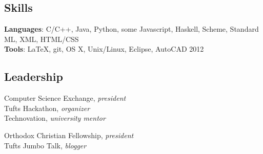 \documentclass{article}
\newcommand{\skill}[2]{
  \textbf{#1}: #2
  \smallskip
}
\newcommand{\skillNS}[2]{
  \textbf{#1}: #2
}
\begin{document}
\begin{comment}
\subsection*{Projects}
  \skill{Type Inference}
        {Implemented Hindley-Milner type inference for a teaching language in
        ML. Wrote a constraint solver to assign types to correct terms and
        reject ill-typed terms.} \\
  \skill{TapItOut}
        {Developed the front end of a native Android app that allows
        peer-to-peer money transfer using NFC technology. Built at the 2013
        University Hacker Olympics in San Francisco.} \\
  \skill{Virtual Machine}
        {Designed and wrote a 32-bit virtual machine in C. Implemented a set of
        basic operations and a macro assembler to create executable binary
        files. Wrote a calculator program in assembly.}
\end{comment}

\subsection*{Skills}
  \skillNS{Languages} {C/C++, Java, Python, some Javascript,
                      Haskell, Scheme, Standard ML, XML, HTML/CSS}\\
  \skillNS{Tools}     {LaTeX, git, OS X, Unix/Linux, Eclipse, AutoCAD 2012}

\subsection*{Leadership}
\begin{minipage}[b]{0.5\linewidth}
Computer Science Exchange, \textit{president} \\
Tufts Hackathon, \textit{organizer} \\
Technovation, \textit{university mentor}
\end{minipage}
\hspace{0.25cm}
\begin{minipage}[b]{0.5\linewidth}
Orthodox Christian Fellowship, \textit{president} \\
Tufts Jumbo Talk, \textit{blogger} \\
\end{minipage}
\end{document}
